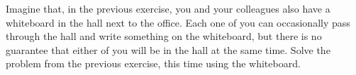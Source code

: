 \documentclass[11pt]{article}
\begin{document}
\begin{myExercise}
Imagine that, in the previous exercise, you and your colleagues also have a whiteboard in the hall next to the office. Each one of you can occasionally pass through the hall and write something on the whiteboard, but there is no guarantee that either of you will be in the hall at the same time.
Solve the problem from the previous exercise, this time using the whiteboard.
\end{myExercise}





\end{document}
